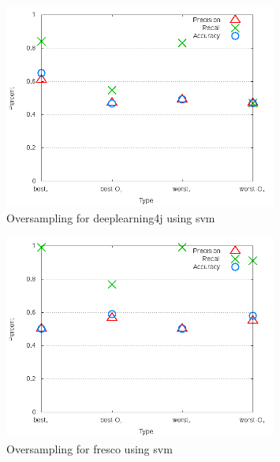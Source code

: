 \begin{figure}[!t]
\centering
\includegraphics[width=0.8\textwidth]{images/svm/test_4/deeplearning4j_sample_range.png}
\caption{Oversampling for deeplearning4j using \gls{svm}}
\label{fig:test_4_deeplearning4j_svm}
\end{figure}

\begin{figure}[!t]
\centering
\includegraphics[width=0.8\textwidth]{images/svm/test_4/fresco_sample_range.png}
\caption{Oversampling for fresco using \gls{svm}}
\label{fig:test_4_fresco_svm}
\end{figure}

